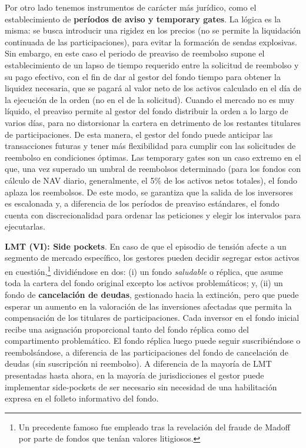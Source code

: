 \documentclass[10pt,a4paper]{article}
\begin{document}
Por otro lado tenemos instrumentos de carácter más jurídico, como el establecimiento de \textbf{períodos de aviso y temporary gates}. La lógica es la misma: se busca introducir una rigidez en los precios (no se permite la liquidación continuada de las participaciones), para evitar la formación de sendas explosivas. Sin embargo, en este caso el periodo de preaviso de reembolso supone el establecimiento de un lapso de tiempo requerido entre la solicitud de reembolso y su pago efectivo, con el fin de dar al gestor del fondo tiempo para obtener la liquidez necesaria, que se pagará al valor neto de los activos calculado en el día de la ejecución de la orden (no en el de la solicitud). Cuando el mercado no es muy líquido, el preaviso permite al gestor del fondo distribuir la orden a lo largo de varios días, para no distorsionar la cartera en detrimento de los restantes titulares de participaciones. De esta manera, el gestor del fondo puede anticipar las transacciones futuras y tener más flexibilidad para cumplir con las solicitudes de reembolso en condiciones óptimas. Las temporary gates son un caso extremo en el que, una vez superado un umbral de reembolsos determinado (para los fondos con cálculo de NAV diario, generalmente, el 5\% de los activos netos totales), el fondo aplaza los reembolsos. De este modo, se garantiza que la salida de los inversores es escalonada y, a diferencia de los períodos de preaviso estándares, el fondo cuenta con discrecionalidad para ordenar las peticiones y elegir los intervalos para ejecutarlas.

\textbf{LMT (VI): Side pockets}. En caso de que el episodio de tensión afecte a un segmento de mercado específico, los gestores pueden decidir segregar estos activos en cuestión,\footnote{%
    Un precedente famoso fue empleado tras la revelación del fraude de Madoff por parte de fondos que tenían valores litigiosos.
} dividiéndose en dos: (i) un fondo \textit{saludable} o réplica, que asume toda la cartera del fondo original excepto los activos problemáticos; y, (ii) un fondo de \textbf{cancelación de deudas}, gestionado hacia la extinción, pero que puede esperar un aumento en la valoración de las inversiones afectadas que permita la compensación de los titulares de participaciones. Cada inversor en el fondo inicial recibe una asignación proporcional tanto del fondo réplica como del compartimento problemático. El fondo réplica luego puede seguir suscribiéndose o reembolsándose, a diferencia de las participaciones del fondo de cancelación de deudas (sin suscripción ni reembolso). A diferencia de la mayoría de LMT presentadas hasta ahora, en la mayoría de jurisdicciones el gestor puede implementar side-pockets de ser necesario sin necesidad de una habilitación expresa en el folleto informativo del fondo.
\end{document}
